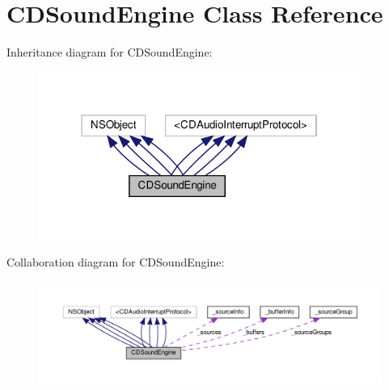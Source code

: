 \hypertarget{interfaceCDSoundEngine}{}\section{C\+D\+Sound\+Engine Class Reference}
\label{interfaceCDSoundEngine}


Inheritance diagram for C\+D\+Sound\+Engine\+:
\nopagebreak
\begin{figure}[H]
\begin{center}
\leavevmode
\includegraphics[width=298pt]{interfaceCDSoundEngine__inherit__graph}
\end{center}
\end{figure}


Collaboration diagram for C\+D\+Sound\+Engine\+:
\nopagebreak
\begin{figure}[H]
\begin{center}
\leavevmode
\includegraphics[width=350pt]{interfaceCDSoundEngine__coll__graph}
\end{center}
\end{figure}
